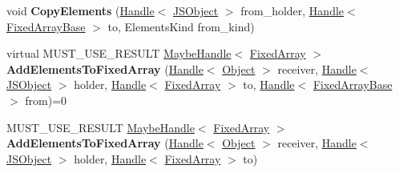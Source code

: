 \begin{DoxyCompactItemize}
\item 
\hypertarget{classv8_1_1internal_1_1_elements_accessor_a478b5ddc17e0e9166f9b5298fa11d75c}{}void {\bfseries Copy\+Elements} (\hyperlink{classv8_1_1internal_1_1_handle}{Handle}$<$ \hyperlink{classv8_1_1internal_1_1_j_s_object}{J\+S\+Object} $>$ from\+\_\+holder, \hyperlink{classv8_1_1internal_1_1_handle}{Handle}$<$ \hyperlink{classv8_1_1internal_1_1_fixed_array_base}{Fixed\+Array\+Base} $>$ to, Elements\+Kind from\+\_\+kind)\label{classv8_1_1internal_1_1_elements_accessor_a478b5ddc17e0e9166f9b5298fa11d75c}

\item 
\hypertarget{classv8_1_1internal_1_1_elements_accessor_a5dd64499a500d74eef1463ed7583ff4a}{}virtual M\+U\+S\+T\+\_\+\+U\+S\+E\+\_\+\+R\+E\+S\+U\+L\+T \hyperlink{classv8_1_1internal_1_1_maybe_handle}{Maybe\+Handle}$<$ \hyperlink{classv8_1_1internal_1_1_fixed_array}{Fixed\+Array} $>$ {\bfseries Add\+Elements\+To\+Fixed\+Array} (\hyperlink{classv8_1_1internal_1_1_handle}{Handle}$<$ \hyperlink{classv8_1_1internal_1_1_object}{Object} $>$ receiver, \hyperlink{classv8_1_1internal_1_1_handle}{Handle}$<$ \hyperlink{classv8_1_1internal_1_1_j_s_object}{J\+S\+Object} $>$ holder, \hyperlink{classv8_1_1internal_1_1_handle}{Handle}$<$ \hyperlink{classv8_1_1internal_1_1_fixed_array}{Fixed\+Array} $>$ to, \hyperlink{classv8_1_1internal_1_1_handle}{Handle}$<$ \hyperlink{classv8_1_1internal_1_1_fixed_array_base}{Fixed\+Array\+Base} $>$ from)=0\label{classv8_1_1internal_1_1_elements_accessor_a5dd64499a500d74eef1463ed7583ff4a}

\item 
\hypertarget{classv8_1_1internal_1_1_elements_accessor_a70a9f12bce02f0d4179b1f4588556fd1}{}M\+U\+S\+T\+\_\+\+U\+S\+E\+\_\+\+R\+E\+S\+U\+L\+T \hyperlink{classv8_1_1internal_1_1_maybe_handle}{Maybe\+Handle}$<$ \hyperlink{classv8_1_1internal_1_1_fixed_array}{Fixed\+Array} $>$ {\bfseries Add\+Elements\+To\+Fixed\+Array} (\hyperlink{classv8_1_1internal_1_1_handle}{Handle}$<$ \hyperlink{classv8_1_1internal_1_1_object}{Object} $>$ receiver, \hyperlink{classv8_1_1internal_1_1_handle}{Handle}$<$ \hyperlink{classv8_1_1internal_1_1_j_s_object}{J\+S\+Object} $>$ holder, \hyperlink{classv8_1_1internal_1_1_handle}{Handle}$<$ \hyperlink{classv8_1_1internal_1_1_fixed_array}{Fixed\+Array} $>$ to)\label{classv8_1_1internal_1_1_elements_accessor_a70a9f12bce02f0d4179b1f4588556fd1}

\end{DoxyCompactItemize}
